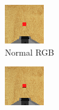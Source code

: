 \begin{figure}[htpb] %
  \centering
  \begin{subfigure}{0.2\linewidth}
    \centering
    \includegraphics[width=\linewidth]{assets/depth-interfacing/normal-size-wrist.png}
    \caption{Normal RGB}\label{subfig:normal-rgb}
  \end{subfigure}
  \begin{subfigure}{0.2\linewidth}
    \centering
    \includegraphics[width=\linewidth]{assets/depth-interfacing/smaller-wrist.png}

\end{subfigure}
\end{figure}
